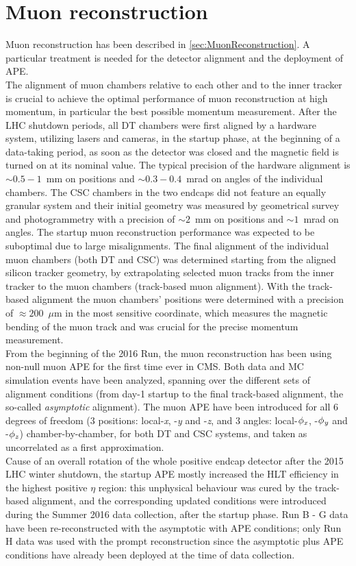 \section{Muon reconstruction}
\label{sec:Reconstruction}
Muon reconstruction has been described in \ref{sec:MuonReconstruction}. A particular treatment is needed for the detector alignment and the deployment of APE. \\
The alignment of muon chambers relative to each other and to the inner tracker is crucial to achieve the optimal performance of muon reconstruction at high momentum, in particular the best possible momentum measurement. After the LHC shutdown periods, all DT chambers were first aligned by a hardware system, utilizing lasers and cameras, in the startup phase, at the beginning of a data-taking period, as soon as the detector was closed and the magnetic field is turned on at its nominal value. The typical precision of the hardware alignment is $\sim0.5 - 1$~mm on positions and $\sim0.3 - 0.4$~mrad on angles of the individual chambers. The CSC chambers in the two endcaps did not feature an equally granular system and their initial geometry was measured by geometrical survey and photogrammetry with a precision of $\sim2$~mm on positions and $\sim1$~mrad on angles. 
The startup muon reconstruction performance was expected to be suboptimal due to large misalignments. The final alignment of the individual muon chambers (both DT and CSC) was determined starting from the aligned silicon tracker geometry, by extrapolating selected muon tracks from the inner tracker to the muon chambers (track-based muon alignment). With the track-based alignment the muon chambers' positions were determined with a precision of $\approx200$~$\mu$m in the most sensitive coordinate, which measures the magnetic bending of the muon track and was crucial for the precise momentum measurement. \\
From the beginning of the 2016 Run, the muon reconstruction has been using non-null muon APE for the first time ever in CMS. Both data and MC simulation events have been analyzed, spanning over the different sets of alignment conditions (from day-1 startup to the final track-based alignment, the so-called {\it{asymptotic}} alignment). The muon APE have been introduced for all 6 degrees of freedom (3 positions: local-{\it{x}}, -{\it{y}} and -{\it{z}}, and 3 angles: local-$\phi_{\it{x}}$, -$\phi_{\it{y}}$ and -$\phi_{\it{z}}$) chamber-by-chamber, for both DT and CSC systems, and taken as uncorrelated as a first approximation. \\
Cause of an overall rotation of the whole positive endcap detector after the 2015 LHC winter shutdown, the startup APE mostly increased the HLT efficiency in the highest positive $\eta$ region: this unphysical behaviour was cured by the track-based alignment, and the corresponding updated conditions were introduced during the Summer 2016 data collection, after the startup phase. Run B - G data have been re-reconstructed with the asymptotic with APE conditions; only Run H data was used with the prompt reconstruction since the asymptotic plus APE conditions have already been deployed at the time of data collection.

